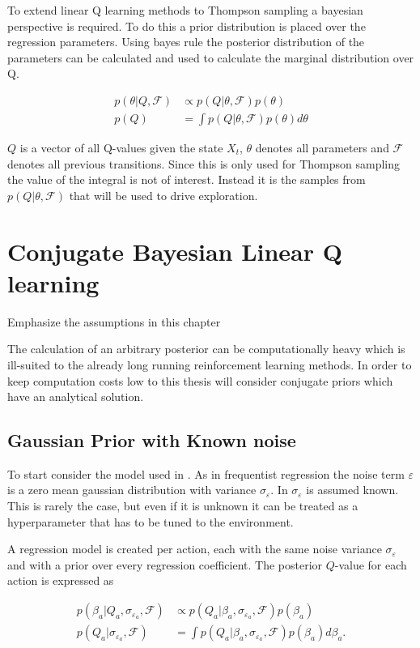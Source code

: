 To extend linear Q learning methods to Thompson sampling a bayesian perspective is required. To do this a prior distribution is placed over the regression parameters. Using bayes rule the posterior distribution of the parameters can be calculated and used to calculate the marginal distribution over Q.

\begin{align*}
p(\theta |Q, \mathcal{F}) &\propto p(Q| \theta, \mathcal{F})p(\theta) \\
p(Q) &= \int p(Q|\theta, \mathcal{F}) p(\theta) d\theta
\end{align*}

$Q$ is a vector of all Q-values given the state $X_t$, $\theta$ denotes all parameters and $\mathcal{F}$ denotes all previous transitions. Since this is only used for Thompson sampling the value of the integral is not of interest. Instead it is the samples from $p(Q|\theta, \mathcal{F})$ that will be used to drive exploration.

\section{Conjugate Bayesian Linear Q learning}

\todo Emphasize the assumptions in this chapter

The calculation of an arbitrary posterior can be computationally heavy which is ill-suited to the already long running reinforcement learning methods. In order to keep computation costs low to this thesis will consider conjugate priors which have an analytical solution.

\subsection{Gaussian Prior with Known noise}

To start consider the model used in \cite{azziz_2018}. As in frequentist regression the noise term $\varepsilon$ is a zero mean gaussian distribution with variance $\sigma_\varepsilon$. In \cite{azziz_2018} $\sigma_\varepsilon$ is assumed known. This is rarely the case, but even if it is unknown it can be treated as a hyperparameter that has to be tuned to the environment. 

A regression model is created per action, each with the same noise variance $\sigma_\varepsilon$ and with a prior over every regression coefficient. The posterior $Q$-value for each action is expressed as 

\begin{align*}
    p(\beta_a |Q_a, \sigma_{\varepsilon_a}, \mathcal{F}) &\propto p(Q_a| \beta_a, \sigma_{\varepsilon_a}, \mathcal{F})p(\beta_a) \\
    p(Q_a|\sigma_{\varepsilon_a}, \mathcal{F}) &= \int p(Q_a|\beta_a, \sigma_{\varepsilon_a}, \mathcal{F}) p(\beta_a)d\beta_a.
\end{align*}

